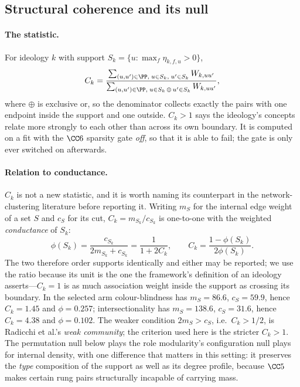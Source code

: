 \subsection{Structural coherence and its null}\label{app:coherence}

\paragraph{The statistic.} For ideology $k$ with support
$S_k=\{u:\max_f\eta_{k,f,u}>0\}$,
\[
  C_k=\frac{\sum_{(u,u')\in\PP,\;u\in S_k,\;u'\in S_k}W_{k,uu'}}
           {\sum_{(u,u')\in\PP,\;u\in S_k\,\oplus\,u'\in S_k}W_{k,uu'}},
\]
where $\oplus$ is exclusive or, so the denominator collects exactly the pairs with one
endpoint inside the support and one outside. $C_k>1$ says the ideology's concepts relate
more strongly to each other than across its own boundary. It is computed on a fit with
the $\CC6$ sparsity gate \emph{off}, so that it is able to fail; the gate is only ever
switched on afterwards.

\paragraph{Relation to conductance.} $C_k$ is not a new statistic, and it is worth
naming its counterpart in the network-clustering literature before reporting it. Writing
$m_{S}$ for the internal edge weight of a set $S$ and $c_{S}$ for its cut,
$C_k=m_{S_k}/c_{S_k}$ is one-to-one with the weighted \emph{conductance} of $S_k$:
\[
  \phi(S_k)=\frac{c_{S_k}}{2m_{S_k}+c_{S_k}}=\frac{1}{1+2C_k},
  \qquad C_k=\frac{1-\phi(S_k)}{2\phi(S_k)} .
\]
The two therefore order supports identically and either may be reported; we use the ratio
because its unit is the one the framework's definition of an ideology asserts---$C_k=1$
is as much association weight inside the support as crossing its boundary. In the
selected arm colour-blindness has $m_{S}=86.6$, $c_{S}=59.9$, hence $C_k=1.45$ and
$\phi=0.257$; intersectionality has $m_{S}=138.6$, $c_{S}=31.6$, hence $C_k=4.38$ and
$\phi=0.102$. The weaker condition $2m_{S}>c_{S}$, i.e.\ $C_k>1/2$, is
Radicchi et al.'s \emph{weak community}; the criterion used here is the stricter
$C_k>1$. The permutation null below plays the role modularity's configuration null plays
for internal density, with one difference that matters in this setting: it preserves the
\emph{type} composition of the support as well as its degree profile, because $\CC5$
makes certain rung pairs structurally incapable of carrying mass.


